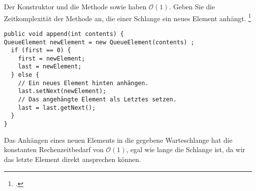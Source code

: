 \documentclass{bschlangaul-aufgabe}
\begin{document}

\noindent
Der Konstruktor  und die Methode
 sowie  haben
$\mathcal{O}(1)$. Geben Sie die Zeitkomplexität der Methode
 an, die einer Schlange ein neues
Element anhängt.
\footcite[Seite 3, Aufgabe 3]{aud:pu:2}

\begin{verbatim}
public void append(int contents) {
QueueElement newElement = new QueueElement(contents) ;
  if (first == 0) {
    first = newElement;
    last = newElement;
  } else {
    // Ein neues Element hinten anhängen.
    last.setNext(newElement);
    // Das angehängte Element als Letztes setzen.
    last = last.getNext();
  }
}
\end{verbatim}

\begin{bAntwort}
Das Anhängen eines neuen Elements in die gegebene Warteschlange hat
die konstanten Rechenzeitbedarf von $\mathcal{O}(1)$, egal wie lange die
Schlange ist, da wir das letzte Element direkt ansprechen können.
\end{bAntwort}
\end{document}
